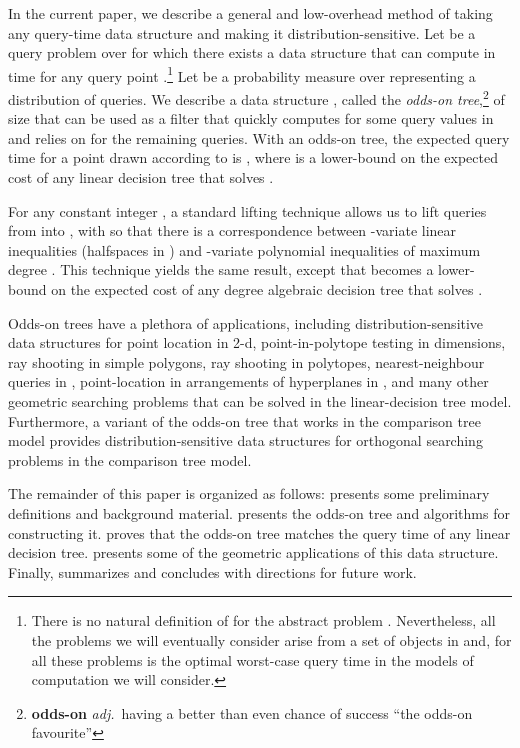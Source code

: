 \documentclass{patmorin}
\begin{document}
In the current paper, we describe a general and low-overhead method
of taking any  query-time data structure and making it
distribution-sensitive.  Let  be a query
problem over  for which there exists a data structure 
that can compute  in  time for any query
point .\footnote{There is no natural definition of  for
the abstract problem .  Nevertheless, all the problems
we will eventually consider arise from a set of  objects in 
and, for all these problems  is the optimal worst-case
query time in the models of computation we will consider.}  Let 
be a probability measure over  representing a distribution
of queries.  We describe a data structure ,
called the \emph{odds-on tree},\footnote{\textbf{odds-on} 
\textit{adj.}\ having a better than even chance of success ``the odds-on
favourite''}  of size  that can be used as a filter that
quickly computes  for some query values in  and
relies on  for the remaining queries.  With an odds-on tree,
the expected query time for a point drawn according to  is ,
where  is a lower-bound on the expected cost of any linear decision
tree that solves .

For any constant integer , a standard lifting technique allows us
to lift queries from  into , with 
so that there is a correspondence between -variate linear inequalities
(halfspaces in ) and -variate polynomial inequalities of
maximum degree  \cite{yy85}.  This technique yields the same result,
except that  becomes a lower-bound on the expected cost of any
degree  algebraic decision tree that solves .

Odds-on trees have a plethora of applications, including
distribution-sensitive data structures for point location in 2-d,
point-in-polytope testing in  dimensions, ray shooting in simple
polygons, ray shooting in polytopes, nearest-neighbour queries in ,
point-location in arrangements of hyperplanes in , and many other
geometric searching problems that can be solved in the linear-decision
tree model.  Furthermore, a variant of the odds-on tree that works in
the comparison tree model provides distribution-sensitive data structures
for orthogonal searching problems in the comparison tree model.

The remainder of this paper is organized as follows:
 presents some preliminary definitions and background
material.  presents the odds-on tree and
algorithms for constructing it.   proves that the
odds-on tree matches the query time of any linear decision tree.
 presents some of the geometric applications of this
data structure. Finally,  summarizes and concludes
with directions for future work.
\end{document}

